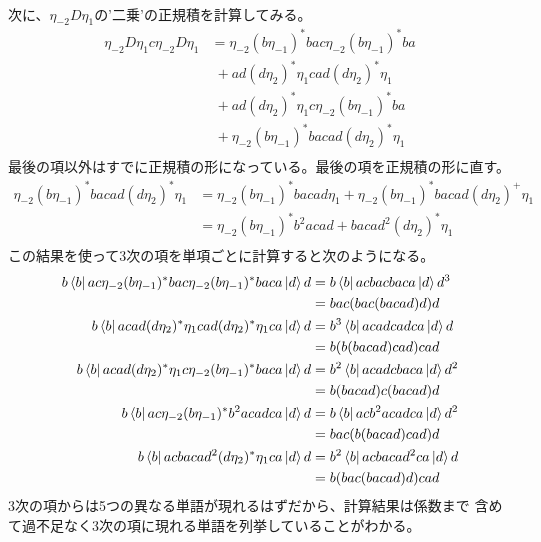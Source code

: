 {\begin{equation*}
\begin{split}
	\end{split}\end{equation*}
	次に、$\eta_{-2}D\eta_{1}$の'二乗'の正規積を計算してみる。
	\begin{equation*}\begin{split}
		\eta_{-2}D\eta_{1}c\eta_{-2}D\eta_{1} 
		&= \eta_{-2}(b\eta_{-1})^*ba c \eta_{-2}(b\eta_{-1})^*ba \\
		&\;+ ad(d\eta_{2})^*\eta_{1} c ad(d\eta_{2})^*\eta_{1} \\
		&\;+ ad(d\eta_{2})^*\eta_{1} c \eta_{-2}(b\eta_{-1})^*ba \\
		&\;+ \eta_{-2}(b\eta_{-1})^*ba c ad(d\eta_{2})^*\eta_{1} \\
	\end{split}\end{equation*}
	最後の項以外はすでに正規積の形になっている。最後の項を正規積の形に直す。
	\begin{equation*}\begin{split}
		\eta_{-2}(b\eta_{-1})^*ba c ad(d\eta_{2})^*\eta_{1}
		&= \eta_{-2}(b\eta_{-1})^*ba c ad\eta_{1}
		+ \eta_{-2}(b\eta_{-1})^*ba c ad(d\eta_{2})^+\eta_{1} \\
		&= \eta_{-2}(b\eta_{-1})^*b^2a c ad + ba c ad^2(d\eta_{2})^*\eta_{1} \\
	\end{split}\end{equation*}
	この結果を使って$3$次の項を単項ごとに計算すると次のようになる。
	\begin{equation*}\begin{split}
		b\mathinner{\langle{b}|}ac \eta_{-2}(b\eta_{-1})^*ba c \eta_{-2}(b\eta_{-1})^*ba ca\mathinner{|{d}\rangle}d
		&= b\mathinner{\langle{b}|}acbacbaca\mathinner{|{d}\rangle}d^3 \\
		&= bac(bac(bacad)d)d \\
		b\mathinner{\langle{b}|}ac ad(d\eta_{2})^*\eta_{1} c ad(d\eta_{2})^*\eta_{1} ca\mathinner{|{d}\rangle}d
		&= b^3\mathinner{\langle{b}|}ac ad c ad ca\mathinner{|{d}\rangle}d \\
		&= b(b(bacad)cad)cad \\
		b\mathinner{\langle{b}|}ac ad(d\eta_{2})^*\eta_{1} c \eta_{-2}(b\eta_{-1})^*ba ca\mathinner{|{d}\rangle}d
		&= b^2\mathinner{\langle{b}|}ac ad c ba ca\mathinner{|{d}\rangle}d^2 \\
		&= b(bacad)c(bacad)d \\
		b\mathinner{\langle{b}|}ac \eta_{-2}(b\eta_{-1})^*b^2a c ad ca\mathinner{|{d}\rangle}d
		&= b\mathinner{\langle{b}|}ac b^2a c ad ca\mathinner{|{d}\rangle}d^2 \\
		&= bac(b(bacad)cad)d \\
		b\mathinner{\langle{b}|}ac ba c ad^2(d\eta_{2})^*\eta_{1} ca\mathinner{|{d}\rangle}d
		&= b^2\mathinner{\langle{b}|}ac ba c ad^2 ca\mathinner{|{d}\rangle}d \\
		&= b(bac(bacad)d)cad \\
	\end{split}\end{equation*}
	3次の項からは5つの異なる単語が現れるはずだから、計算結果は係数まで
	含めて過不足なく3次の項に現れる単語を列挙していることがわかる。

}
